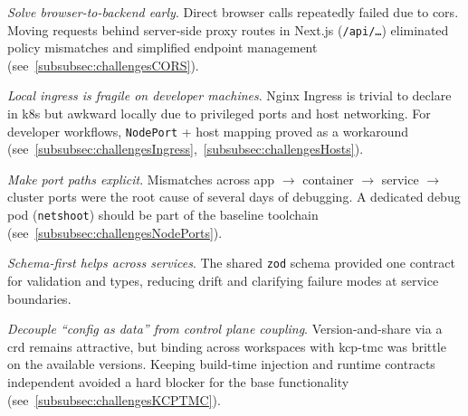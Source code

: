 \documentclass[11pt, a4paper, oneside, listof=totoc]{scrartcl}
\begin{document}
            \begin{enumerate}[label={[\arabic*]:},
                ref=Challenge~\arabic*,
                leftmargin=*,
                itemsep=0.6\baselineskip]

                \item\label{chal:evalLessonsCORS}
                    \textit{Solve browser-to-backend early}.
                    Direct browser calls repeatedly failed due to \gls{cors}.
                    Moving requests behind server-side proxy routes in Next.js (\texttt{/api/\dots})
                    eliminated policy mismatches and simplified endpoint management
                    (see~\autoref{subsubsec:challengesCORS}).

                \item\label{chal:evalLessonsIngress}
                    \textit{Local ingress is fragile on developer machines}.
                    Nginx Ingress is trivial to declare in \gls{k8s} but awkward locally due to
                    privileged ports and host networking.
                    For developer workflows, \texttt{NodePort} + host mapping proved as a workaround
                    (see~\autoref{subsubsec:challengesIngress},~\autoref{subsubsec:challengesHosts}).

                \item\label{Make port paths explicit}
                    \textit{Make port paths explicit}.
                    Mismatches across app $\rightarrow$ container $\rightarrow$ service
                    $\rightarrow$ cluster ports were the root cause of several days of debugging.
                    A dedicated debug pod (\texttt{netshoot}) should be part of the baseline
                    toolchain (see~\autoref{subsubsec:challengesNodePorts}).

                \item\label{chal:evalLessonsSchemaFirst}
                    \textit{Schema-first helps across services}.
                    The shared \texttt{zod} schema provided one contract for validation and types,
                    reducing drift and clarifying failure modes at service boundaries.

                \item\label{chal:evalLessonsDecoupleConfig}
                    \textit{Decouple \enquote{config as data} from control plane coupling}.
                    Version-and-share via a \gls{crd} remains attractive, but binding across
                    workspaces with \gls{kcp}-\gls{tmc} was brittle on the available versions.
                    Keeping build-time injection and runtime contracts independent avoided a hard
                    blocker for the base functionality (see~\autoref{subsubsec:challengesKCPTMC}).


\end{enumerate}
\end{document}
